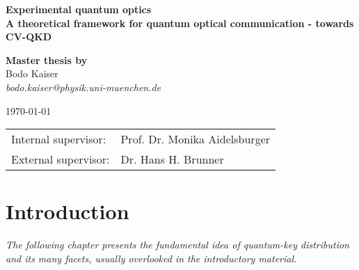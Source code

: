 \documentclass[
	a4paper,
	parskip,
	appendixprefix,
	chapterprefix,
	headings=big,
]{scrreprt}
\numberwithin{equation}{section}
\theoremstyle{definition}
\begin{document}
	\begin{titlepage}
		\begin{center}
			\large
   		    \textbf{\textsf{Experimental quantum optics}}\\
		    \vspace{0.8em}
			\huge
		    \textbf{\textsf{A theoretical framework for quantum optical communication - towards CV-QKD}}\\
			
			\vspace{1.2em}
			\begin{figure}[htb]
				\centering
			    
			\end{figure}
			
			\vspace{.6em}
		    \large
		    \textbf{Master thesis by}\\
			\vspace{.8em}
		    \large
			Bodo Kaiser\\
		    \vspace{.2em}
			\textit{bodo.kaiser@physik.uni-muenchen.de}

		    \large
		    \today

		    \vspace{1.9em}
			\normalsize
			\begin{tabular}{ll}
			Internal supervisor: & Prof. Dr. Monika Aidelsburger \\
			External supervisor: & Dr. Hans H. Brunner \\
			\end{tabular}
		\end{center}
	\end{titlepage}
	\tableofcontents

	\chapter{Introduction}
	\begin{refsection}
		\textit{The following chapter presents the fundamental idea of quantum-key distribution and its many facets, usually overlooked in the introductory material.}
        
        
        
        
        
	
		\printbibliography[title=References]
	\end{refsection}
	
\end{document}
